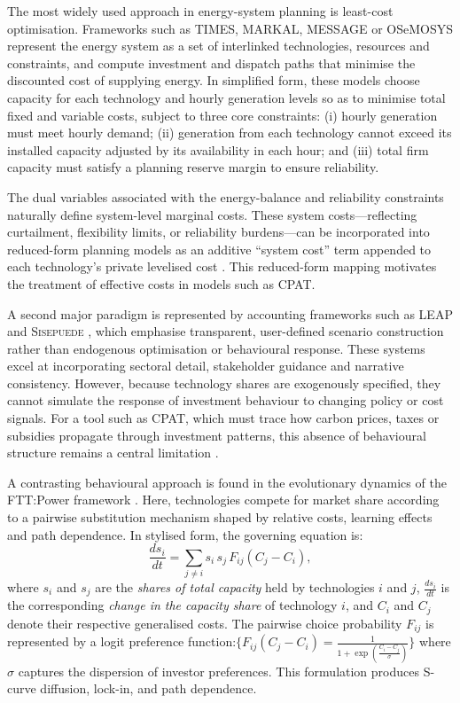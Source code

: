 \documentclass[preprint,authoryear,12pt]{elsarticle}
\begin{document}
The most widely used approach in energy-system planning is least-cost optimisation. Frameworks such as TIMES, MARKAL, MESSAGE or OSeMOSYS represent the energy system as a set of interlinked technologies, resources and constraints, and compute investment and dispatch paths that minimise the discounted cost of supplying energy. In simplified form, these models choose capacity for each technology and hourly generation levels so as to minimise total fixed and variable costs, subject to three core constraints: (i) hourly generation must meet hourly demand; (ii) generation from each technology cannot exceed its installed capacity adjusted by its availability in each hour; and (iii) total firm capacity must satisfy a planning reserve margin to ensure reliability.

The dual variables associated with the energy-balance and reliability constraints naturally define system-level marginal costs. These system costs—reflecting curtailment, flexibility limits, or reliability burdens—can be incorporated into reduced-form planning models as an additive “system cost” term appended to each technology’s private levelised cost \citep{grubb2019, miller2023}. This reduced-form mapping motivates the treatment of effective costs in models such as \textsc{CPAT}.

A second major paradigm is represented by accounting frameworks such as \textsc{LEAP}
\citep{leap2020} and \textsc{Sisepuede} \citep{sisepuede2024}, which emphasise transparent,
user-defined scenario construction rather than endogenous optimisation or behavioural
response. These systems excel at incorporating sectoral detail, stakeholder guidance and
narrative consistency. However, because technology shares are exogenously specified, they
cannot simulate the response of investment behaviour to changing policy or cost signals. For a
tool such as \textsc{CPAT}, which must trace how carbon prices, taxes or subsidies propagate
through investment patterns, this absence of behavioural structure remains a central
limitation \citep{CPATdocs}.

A contrasting behavioural approach is found in the evolutionary dynamics of the FTT:Power
framework \citep{Mercure2012}. Here, technologies compete for market share according to a
pairwise substitution mechanism shaped by relative costs, learning effects and path dependence.
In stylised form, the governing equation is:
\begin{equation}
\frac{ds_i}{dt} = \sum_{j \neq i} s_i \, s_j \, F_{ij}(C_j - C_i),
\end{equation}
where $s_i$ and $s_j$ are the \textit{shares of total capacity} held by technologies $i$ and $j$, 
$\frac{ds_i}{dt}$ is the corresponding \textit{change in the capacity share} of technology $i$, 
and $C_i$ and $C_j$ denote their respective generalised costs. The pairwise choice probability $F_{ij}$ is represented by a logit preference function:$\{F_{ij}(C_j - C_i) = 
\frac{1}{1 + \exp\!\left( \frac{C_i - C_j}{\sigma} \right)}\}$ where $\sigma$ captures the dispersion of investor preferences. This formulation produces S-curve diffusion,
lock-in, and path dependence.
\end{document}
